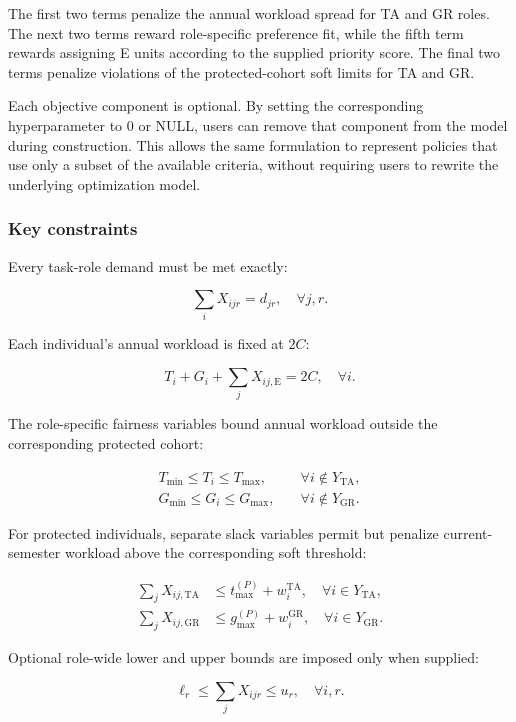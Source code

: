 The first two terms penalize the annual workload spread for TA and GR roles.
The next two terms reward role-specific preference fit, while the fifth term
rewards assigning E units according to the supplied priority score. The final
two terms penalize violations of the protected-cohort soft limits for TA and GR.

Each objective component is optional. By setting the corresponding hyperparameter
to 0 or NULL, users can remove that component from the model during construction.
This allows the same formulation to represent policies that use only a
subset of the available criteria, without requiring users to rewrite the
underlying optimization model.

\subsubsection{Key constraints}\label{key-constraints-2}

Every task-role demand must be met exactly:

\[
\sum_iX_{ijr}=d_{jr},\quad \forall j,r. \tag{11}
\]

Each individual's annual workload is fixed at \(2C\):

\[
T_i + G_i
+\sum_jX_{ij,\mathrm{E}}=2C,\quad \forall i. \tag{12}
\]

The role-specific fairness variables bound annual workload outside the
corresponding protected cohort:

\[
\begin{aligned}
T_{\min}\leq T_i\leq T_{\max},
&\quad \forall i\notin Y_{\mathrm{TA}},\\
G_{\min}\leq G_i\leq G_{\max},
&\quad \forall i\notin Y_{\mathrm{GR}}.
\end{aligned}\tag{13}
\]

For protected individuals, separate slack variables permit but penalize
current-semester workload above the corresponding soft threshold:

\[
\begin{aligned}
\sum_jX_{ij,\mathrm{TA}}
&\leq t_{\max}^{(P)}+w_i^{\mathrm{TA}},
\quad \forall i\in Y_{\mathrm{TA}},\\
\sum_jX_{ij,\mathrm{GR}}
&\leq g_{\max}^{(P)}+w_i^{\mathrm{GR}},
\quad \forall i\in Y_{\mathrm{GR}}.
\end{aligned}\tag{14}
\]

Optional role-wide lower and upper bounds are imposed only when supplied:

\[
\ell_r\leq\sum_jX_{ijr}\leq u_r,\quad \forall i,r. \tag{15}
\]

